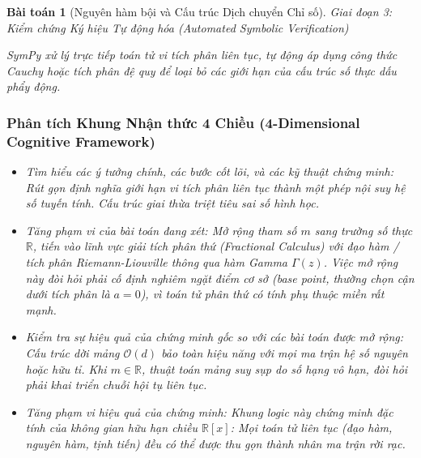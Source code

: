 \documentclass{article}
\newtheorem{baitoan}{Bài toán}
\begin{document}
\begin{baitoan}[Nguyên hàm bội và Cấu trúc Dịch chuyển Chỉ số]
\vspace{0.5em}\noindent\emph{Giai đoạn 3: Kiểm chứng Ký hiệu Tự động hóa (Automated Symbolic Verification)}
 
 \textsf{SymPy} xử lý trực tiếp toán tử vi tích phân liên tục, tự động áp dụng công thức Cauchy hoặc tích phân đệ quy để loại bỏ các giới hạn của cấu trúc số thực dấu phẩy động.



 \subsubsection*{Phân tích Khung Nhận thức 4 Chiều (4-Dimensional Cognitive Framework)}
 \begin{itemize}
 \item \textit{Tìm hiểu các ý tưởng chính, các bước cốt lõi, và các kỹ thuật chứng minh}: Rút gọn định nghĩa giới hạn vi tích phân liên tục thành một phép nội suy hệ số tuyến tính. Cấu trúc giai thừa triệt tiêu sai số hình học.
 \item \textit{Tăng phạm vi của bài toán đang xét}: Mở rộng tham số $m$ sang trường số thực $\mathbb{R}$, tiến vào lĩnh vực giải tích phân thứ (Fractional Calculus) với đạo hàm / tích phân Riemann-Liouville thông qua hàm Gamma $\Gamma(z)$. Việc mở rộng này đòi hỏi phải cố định nghiêm ngặt điểm cơ sở (base point, thường chọn cận dưới tích phân là $a=0$), vì toán tử phân thứ có tính phụ thuộc miền rất mạnh.
 \item \textit{Kiểm tra sự hiệu quả của chứng minh gốc so với các bài toán được mở rộng}: Cấu trúc dời mảng $\mathcal{O}(d)$ bảo toàn hiệu năng với mọi ma trận hệ số nguyên hoặc hữu tỉ. Khi $m \in \mathbb{R}$, thuật toán mảng suy sụp do số hạng vô hạn, đòi hỏi phải khai triển chuỗi hội tụ liên tục.
 \item \textit{Tăng phạm vi hiệu quả của chứng minh}: Khung logic này chứng minh đặc tính của không gian hữu hạn chiều $\mathbb{R}[x]$: Mọi toán tử liên tục (đạo hàm, nguyên hàm, tịnh tiến) đều có thể được thu gọn thành nhân ma trận rời rạc.
 \end{itemize}
\end{baitoan}

\end{document}
